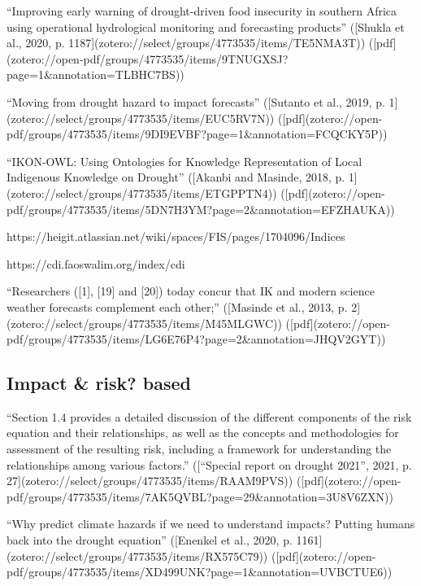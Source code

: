 {“Improving early warning of drought-driven food insecurity in southern Africa using operational hydrological monitoring and forecasting products” ([Shukla et al., 2020, p. 1187](zotero://select/groups/4773535/items/TE5NMA3T)) ([pdf](zotero://open-pdf/groups/4773535/items/9TNUGXSJ?page=1&annotation=TLBHC7BS))

“Moving from drought hazard to impact forecasts” ([Sutanto et al., 2019, p. 1](zotero://select/groups/4773535/items/EUC5RV7N)) ([pdf](zotero://open-pdf/groups/4773535/items/9DI9EVBF?page=1&annotation=FCQCKY5P))

“IKON-OWL: Using Ontologies for Knowledge Representation of Local Indigenous Knowledge on Drought” ([Akanbi and Masinde, 2018, p. 1](zotero://select/groups/4773535/items/ETGPPTN4)) ([pdf](zotero://open-pdf/groups/4773535/items/5DN7H3YM?page=2&annotation=EFZHAUKA))

https://heigit.atlassian.net/wiki/spaces/FIS/pages/1704096/Indices

https://cdi.faoswalim.org/index/cdi

“Researchers ([1], [19] and [20]) today concur that IK and modern science weather forecasts complement each other;” ([Masinde et al., 2013, p. 2](zotero://select/groups/4773535/items/M45MLGWC)) ([pdf](zotero://open-pdf/groups/4773535/items/LG6E76P4?page=2&annotation=JHQV2GYT))

\subsection{Impact \& risk? based}
“Section 1.4 provides a detailed discussion of the different components of the risk equation and their relationships, as well as the concepts and methodologies for assessment of the resulting risk, including a framework for understanding the relationships among various factors.” ([“Special report on drought 2021”, 2021, p. 27](zotero://select/groups/4773535/items/RAAM9PVS)) ([pdf](zotero://open-pdf/groups/4773535/items/7AK5QVBL?page=29&annotation=3U8V6ZXN))

“Why predict climate hazards if we need to understand impacts? Putting humans back into the drought equation” ([Enenkel et al., 2020, p. 1161](zotero://select/groups/4773535/items/RX575C79)) ([pdf](zotero://open-pdf/groups/4773535/items/XD499UNK?page=1&annotation=UVBCTUE6))

}
